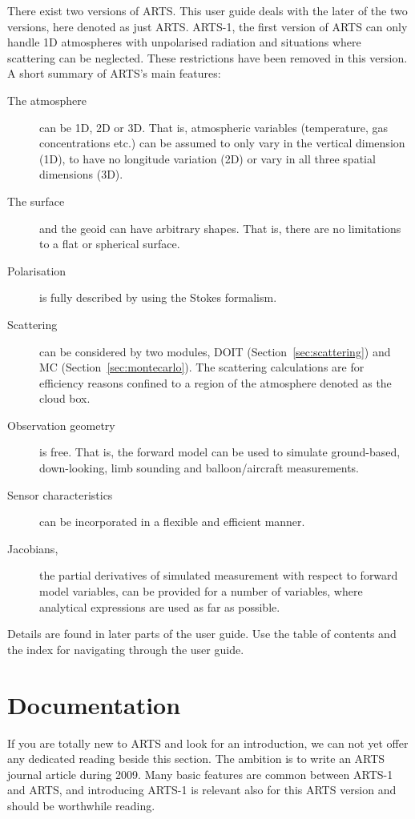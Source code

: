 There exist two versions of ARTS. This user guide deals with the later
of the two versions, here denoted as just ARTS. ARTS-1, the first
version of ARTS \citep{buehler:artst:05} can only handle 1D
atmospheres with unpolarised radiation and situations where scattering
can be neglected. These restrictions have been removed in this
version. A short summary of ARTS's main features:
\begin{description}
\item[The atmosphere] can be 1D, 2D or 3D. That is, atmospheric
  variables (temperature, gas concentrations etc.) can be assumed to
  only vary in the vertical dimension (1D), to have no longitude
  variation (2D) or vary in all three spatial dimensions (3D).
\item[The surface] and the geoid can have arbitrary shapes. That is,
  there are no limitations to a flat or spherical surface.
\item[Polarisation] is fully described by using the Stokes formalism.
\item[Scattering] can be considered by two modules, DOIT
  (Section~\ref{sec:scattering}) and MC
  (Section~\ref{sec:montecarlo}). The scattering calculations are for
  efficiency reasons confined to a region of the atmosphere denoted as
  the cloud box.
\item[Observation geometry] is free. That is, the forward model can be
  used to simulate ground-based, down-looking, limb sounding and
  balloon/aircraft measurements.
\item[Sensor characteristics] can be incorporated in a flexible and
  efficient manner.
\item[Jacobians,] the partial derivatives of simulated measurement
  with respect to forward model variables, can be provided for a
  number of variables, where analytical expressions are used as far as
  possible.
\end{description}
Details are found in later parts of the user guide. Use the table of
contents and the index for navigating through the user guide.



\section{Documentation}
\label{sec:concept:doc}

If you are totally new to ARTS and look for an introduction, we can
not yet offer any dedicated reading beside this section. The ambition
is to write an ARTS journal article during 2009. Many basic features
are common between ARTS-1 and ARTS, and \citet{buehler:artst:05}
introducing ARTS-1 is relevant also for this ARTS version and should
be worthwhile reading.

